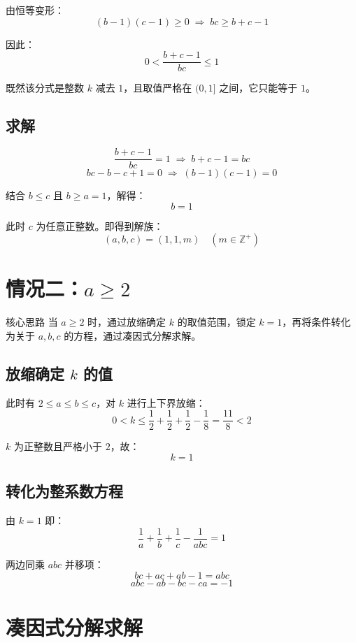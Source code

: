 \documentclass[11pt,a4paper]{ctexart}
\begin{document}
由恒等变形：
\[
  (b-1)(c-1) \ge 0 \;\Longrightarrow\; bc \ge b + c - 1
\]

因此：
\[
  0 < \frac{b+c-1}{bc} \le 1
\]

既然该分式是整数 $k$ 减去 $1$，且取值严格在 $(0,1]$ 之间，它只能等于 $1$。

\subsection*{求解}

\[
  \frac{b + c - 1}{bc} = 1 \;\Longrightarrow\; b + c - 1 = bc
\]
\[
  bc - b - c + 1 = 0 \;\Longrightarrow\; (b-1)(c-1) = 0
\]

结合 $b \le c$ 且 $b \ge a = 1$，解得：
\[
  b = 1
\]

此时 $c$ 为任意正整数。即得到解族：
\[
  (a,b,c) = (1, 1, m) \quad (m \in \mathbb{Z}^+)
\]

\newpage

\section{情况二：$a \ge 2$}

\begin{methodbox}{核心思路}
当 $a \ge 2$ 时，通过放缩确定 $k$ 的取值范围，锁定 $k=1$，再将条件转化为关于 $a,b,c$ 的方程，通过凑因式分解求解。
\end{methodbox}

\subsection*{放缩确定 $k$ 的值}

此时有 $2 \le a \le b \le c$，对 $k$ 进行上下界放缩：
\[
  0 < k \le \frac{1}{2} + \frac{1}{2} + \frac{1}{2} - \frac{1}{8}
       = \frac{11}{8} < 2
\]

$k$ 为正整数且严格小于 $2$，故：
\[
  k = 1
\]

\subsection*{转化为整系数方程}

由 $k=1$ 即：
\[
  \frac{1}{a} + \frac{1}{b} + \frac{1}{c} - \frac{1}{abc} = 1
\]

两边同乘 $abc$ 并移项：
\[
  bc + ac + ab - 1 = abc
\]
\[
  \boxed{\,abc - ab - bc - ca = -1\,}
\]

\section{凑因式分解求解}
\end{document}
